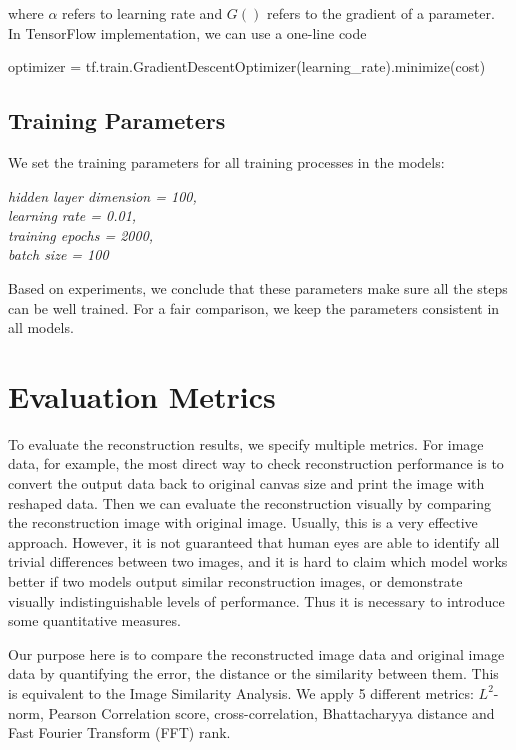\documentclass[12pt]{report} %
\begin{document}
where $\alpha$ refers to learning rate and $G()$ refers to the gradient of a parameter. In TensorFlow implementation, we can use a one-line code
\begin{center}
	optimizer = tf.train.GradientDescentOptimizer(learning\_rate).minimize(cost)
\end{center}

\subsection{Training Parameters}
We set the training parameters for all training processes in the models:

\textit{hidden layer dimension = 100, \\
	learning rate = 0.01, \\
	training epochs = 2000, \\
	batch size = 100}

Based on experiments, we conclude that these parameters make sure all the steps can be well trained. For a fair comparison, we keep the parameters consistent in all models.

\section{Evaluation Metrics}
To evaluate the reconstruction results, we specify multiple metrics. For image data, for example, the most direct way to check reconstruction performance is to convert the output data back to original canvas size and print the image with reshaped data. Then we can evaluate the reconstruction visually by comparing the reconstruction image with original image. Usually, this is a very effective approach. However, it is not guaranteed that human eyes are able to identify all trivial differences between two images, and it is hard to claim which model works better if two models output similar reconstruction images, or demonstrate visually indistinguishable levels of performance. Thus it is necessary to introduce some quantitative measures. 

Our purpose here is to compare the reconstructed image data and original image data by quantifying the error, the distance or the similarity between them. This is equivalent to the Image Similarity Analysis\cite{PCC, CC, ISA}. We apply 5 different metrics: $L^2$-norm\cite{NORM}, Pearson Correlation score\cite{PCC}, cross-correlation\cite{CC}, Bhattacharyya distance\cite{ISA} and Fast Fourier Transform (FFT) rank\cite{ISA}.
\end{document}
